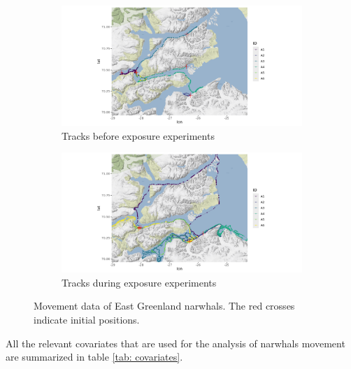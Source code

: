 \documentclass[11pt]{article}
\newcommand {\1}{\mathbb{1}}
\theoremstyle{definition}
\theoremstyle{remark}
\theoremstyle{remark}
\begin{document}
\begin{figure}[H]
	\centering
	\begin{subfigure}{0.49\textwidth}
		\centering
		\includegraphics[scale=0.38]{images/data_exploration/tracksBE1.png}
		\caption{Tracks before exposure experiments}
	\end{subfigure}
	\begin{subfigure}{0.49\textwidth}
		\centering
		\includegraphics[scale=0.38]{images/data_exploration/tracksAE.png}
		\caption{Tracks during exposure experiments}
	\end{subfigure}
	\caption{Movement data of East Greenland narwhals. The red crosses indicate initial positions.}
	\label{fig: tracks before and after exposure}
\end{figure}

 All the relevant covariates that are used for the analysis of narwhals movement are summarized in table \ref{tab: covariates}.
\end{document}
